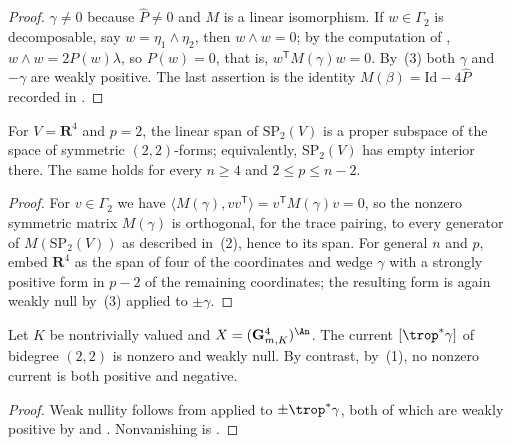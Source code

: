 \begin{proof}
$\gamma\ne0$ because $\widehat P\ne0$ and $M$ is a linear isomorphism.  If
$w\in\Gamma_2$ is decomposable, say $w=\eta_1\wedge\eta_2$, then
$w\wedge w=0$; by the computation of ,
$w\wedge w=2P(w)\lambda$, so $P(w)=0$, that is,
$w^{\mathsf T}M(\gamma)w=0$.  By
\,(3) both $\gamma$ and $-\gamma$ are
weakly positive.  The last assertion is the identity
$M(\beta)=\mathrm{Id}-4\widehat P$ recorded in
.
\end{proof}

\begin{corollary}
\label{cor:ch14-sp-not-spanning}
For $V=\mathbf R^4$ and $p=2$, the linear span of $\mathrm{SP}_2(V)$ is a
proper subspace of the space of symmetric $(2,2)$-forms; equivalently,
$\mathrm{SP}_2(V)$ has empty interior there.  The same holds for every
$n\ge4$ and $2\le p\le n-2$.
\end{corollary}

\begin{proof}
For $v\in\Gamma_2$ we have
$\langle M(\gamma),vv^{\mathsf T}\rangle=v^{\mathsf T}M(\gamma)v=0$, so the
nonzero symmetric matrix $M(\gamma)$ is orthogonal, for the trace pairing, to
every generator of $M(\mathrm{SP}_2(V))$ as described in
\,(2), hence to its span.  For general
$n$ and $p$, embed $\mathbf R^4$ as the span of four of the coordinates and
wedge $\gamma$ with a strongly positive form in $p-2$ of the remaining
coordinates; the resulting form is again weakly null by
\,(3) applied to $\pm\gamma$.
\end{proof}

\begin{corollary}
\label{cor:ch14-weakly-null-currents}
Let $K$ be nontrivially valued and $X=(\mathbf G_{m,K}^4)^{\An}$.  The
current $[\trop^*\gamma]$ of bidegree $(2,2)$ is nonzero and weakly null.  By
contrast, by \,(1), no nonzero current
is both positive and negative.
\end{corollary}

\begin{proof}
Weak nullity follows from  applied to
$\pm\trop^*\gamma$, both of which are weakly positive by
 and .
Nonvanishing is .
\end{proof}

